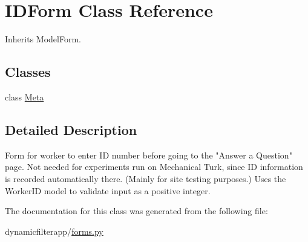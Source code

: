 \hypertarget{classdynamicfilterapp_1_1forms_1_1_i_d_form}{}\section{I\+D\+Form Class Reference}
\label{classdynamicfilterapp_1_1forms_1_1_i_d_form}


Inherits Model\+Form.

\subsection*{Classes}
\begin{DoxyCompactItemize}
\item 
class \mbox{\hyperlink{classdynamicfilterapp_1_1forms_1_1_i_d_form_1_1_meta}{Meta}}
\end{DoxyCompactItemize}


\subsection{Detailed Description}
\begin{DoxyVerb}Form for worker to enter ID number before going to the "Answer a Question" 
page. Not needed for experiments run on Mechanical Turk, since ID information 
is recorded automatically there. (Mainly for site testing purposes.)
Uses the WorkerID model to validate input as a positive integer.
\end{DoxyVerb}
 

The documentation for this class was generated from the following file\+:\begin{DoxyCompactItemize}
\item 
dynamicfilterapp/\mbox{\hyperlink{forms_8py}{forms.\+py}}\end{DoxyCompactItemize}

